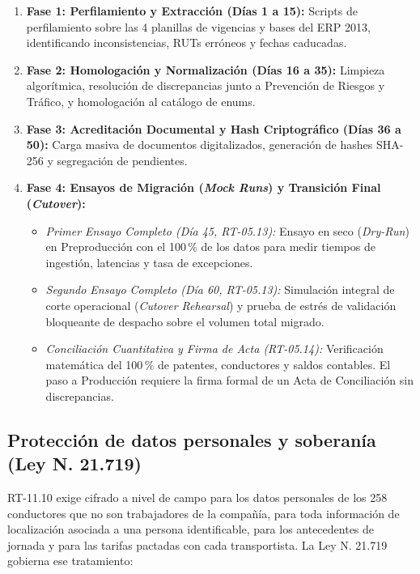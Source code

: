 \begin{enumerate}
    \item \textbf{Fase 1: Perfilamiento y Extracción (Días 1 a 15):} Scripts de perfilamiento sobre las 4 planillas de vigencias y bases del ERP 2013, identificando inconsistencias, RUTs erróneos y fechas caducadas.
    \item \textbf{Fase 2: Homologación y Normalización (Días 16 a 35):} Limpieza algorítmica, resolución de discrepancias junto a Prevención de Riesgos y Tráfico, y homologación al catálogo de enums.
    \item \textbf{Fase 3: Acreditación Documental y Hash Criptográfico (Días 36 a 50):} Carga masiva de documentos digitalizados, generación de hashes SHA-256 y segregación de pendientes.
    \item \textbf{Fase 4: Ensayos de Migración (\textit{Mock Runs}) y Transición Final (\textit{Cutover}):}
    \begin{itemize}
        \item \textit{Primer Ensayo Completo (Día 45, RT-05.13):} Ensayo en seco (\textit{Dry-Run}) en Preproducción con el 100\,\% de los datos para medir tiempos de ingestión, latencias y tasa de excepciones.
        \item \textit{Segundo Ensayo Completo (Día 60, RT-05.13):} Simulación integral de corte operacional (\textit{Cutover Rehearsal}) y prueba de estrés de validación bloqueante de despacho sobre el volumen total migrado.
        \item \textit{Conciliación Cuantitativa y Firma de Acta (RT-05.14):} Verificación matemática del 100\,\% de patentes, conductores y saldos contables. El paso a Producción requiere la firma formal de un Acta de Conciliación sin discrepancias.
    \end{itemize}
\end{enumerate}

\subsection{Protección de datos personales y soberanía (Ley N.\textordmasculine{} 21.719)}

RT-11.10 exige cifrado a nivel de campo para los datos personales de los 258 conductores que no son trabajadores de la compañía, para toda información de localización asociada a una persona identificable, para los antecedentes de jornada y para las tarifas pactadas con cada transportista. La Ley N.\textordmasculine{} 21.719 \parencite{ley21719} gobierna ese tratamiento:

